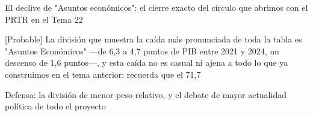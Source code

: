 \documentclass[10pt,a4paper]{article}
\begin{document}
El declive de "Asuntos económicos": el cierre exacto del círculo que abrimos con el PRTR en el Tema 22

[Probable] La división que muestra la caída más pronunciada de toda la tabla es "Asuntos Económicos" —de 6,3 a 4,7 puntos de PIB entre 2021 y 2024, un descenso de 1,6 puntos—, y esta caída no es casual ni ajena a todo lo que ya construimos en el tema anterior: recuerda que el 71,7%

Defensa: la división de menor peso relativo, y el debate de mayor actualidad política de todo el proyecto
\end{document}
